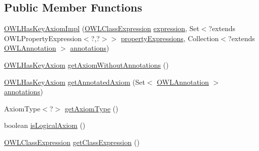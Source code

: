 \subsection*{Public Member Functions}
\begin{DoxyCompactItemize}
\item 
\hyperlink{classuk_1_1ac_1_1manchester_1_1cs_1_1owl_1_1owlapi_1_1_o_w_l_has_key_axiom_impl_a6810eb212a1e399125d31261443c745c}{O\-W\-L\-Has\-Key\-Axiom\-Impl} (\hyperlink{interfaceorg_1_1semanticweb_1_1owlapi_1_1model_1_1_o_w_l_class_expression}{O\-W\-L\-Class\-Expression} \hyperlink{classuk_1_1ac_1_1manchester_1_1cs_1_1owl_1_1owlapi_1_1_o_w_l_has_key_axiom_impl_a355e5d0b0423e63ff9bb68f4e46c6c1a}{expression}, Set$<$?extends O\-W\-L\-Property\-Expression$<$?,?$>$$>$ \hyperlink{classuk_1_1ac_1_1manchester_1_1cs_1_1owl_1_1owlapi_1_1_o_w_l_has_key_axiom_impl_a296ff7ecb945f70f3c9cd48ae13bb0e3}{property\-Expressions}, Collection$<$?extends \hyperlink{interfaceorg_1_1semanticweb_1_1owlapi_1_1model_1_1_o_w_l_annotation}{O\-W\-L\-Annotation} $>$ \hyperlink{classuk_1_1ac_1_1manchester_1_1cs_1_1owl_1_1owlapi_1_1_o_w_l_axiom_impl_af6fbf6188f7bdcdc6bef5766feed695e}{annotations})
\item 
\hyperlink{interfaceorg_1_1semanticweb_1_1owlapi_1_1model_1_1_o_w_l_has_key_axiom}{O\-W\-L\-Has\-Key\-Axiom} \hyperlink{classuk_1_1ac_1_1manchester_1_1cs_1_1owl_1_1owlapi_1_1_o_w_l_has_key_axiom_impl_a65ede5cc0699c19219641dea2247ec22}{get\-Axiom\-Without\-Annotations} ()
\item 
\hyperlink{interfaceorg_1_1semanticweb_1_1owlapi_1_1model_1_1_o_w_l_has_key_axiom}{O\-W\-L\-Has\-Key\-Axiom} \hyperlink{classuk_1_1ac_1_1manchester_1_1cs_1_1owl_1_1owlapi_1_1_o_w_l_has_key_axiom_impl_a98fab7a8892019f274a8beefbb4e74e8}{get\-Annotated\-Axiom} (Set$<$ \hyperlink{interfaceorg_1_1semanticweb_1_1owlapi_1_1model_1_1_o_w_l_annotation}{O\-W\-L\-Annotation} $>$ \hyperlink{classuk_1_1ac_1_1manchester_1_1cs_1_1owl_1_1owlapi_1_1_o_w_l_axiom_impl_af6fbf6188f7bdcdc6bef5766feed695e}{annotations})
\item 
Axiom\-Type$<$?$>$ \hyperlink{classuk_1_1ac_1_1manchester_1_1cs_1_1owl_1_1owlapi_1_1_o_w_l_has_key_axiom_impl_a834dc18fe0ced19b7c467bbb3fd21c3b}{get\-Axiom\-Type} ()
\item 
boolean \hyperlink{classuk_1_1ac_1_1manchester_1_1cs_1_1owl_1_1owlapi_1_1_o_w_l_has_key_axiom_impl_a6f17eadcf14347cf01ee1c6def401a96}{is\-Logical\-Axiom} ()
\item 
\hyperlink{interfaceorg_1_1semanticweb_1_1owlapi_1_1model_1_1_o_w_l_class_expression}{O\-W\-L\-Class\-Expression} \hyperlink{classuk_1_1ac_1_1manchester_1_1cs_1_1owl_1_1owlapi_1_1_o_w_l_has_key_axiom_impl_ac6875ad132b12fa51e6b101def81c300}{get\-Class\-Expression} ()
$$
\end{DoxyCompactItemize}
